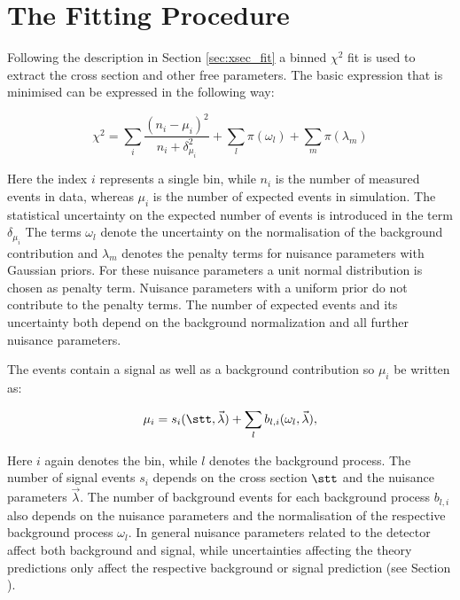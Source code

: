 	
\section{The Fitting Procedure}
\label{sec:xsec_stat}

Following the description in Section \ref{sec:xsec_fit} a binned $\chi^2$ fit is used to extract the cross section and other free parameters.
The basic expression that is minimised can be expressed in the following way:

\begin{equation}
  \chi^2  = \sum_{i} \frac{(n_i-\mu_i)^2}{n_i + \delta_{\mu_i}^2} + \sum_{l} \pi(\omega_l) + \sum_{m} \pi(\lambda_m)
\label{eq:xsec_chisqfunct}
\end{equation}

Here the index $i$ represents a single bin, while $n_i$ is the number of measured events in data, whereas $\mu_i$ is the number
of expected events in simulation. The statistical uncertainty on the expected number of events is introduced in the term $\delta_{\mu_i}$ The terms $\omega_l$ denote the uncertainty on the normalisation of the background contribution and $\lambda_m$
denotes the penalty terms for nuisance parameters with Gaussian priors. For these nuisance parameters a unit normal distribution is chosen as penalty term. Nuisance parameters with a uniform prior do not contribute to the penalty terms.
The number of expected events and its uncertainty both depend on the background normalization and all further nuisance parameters.

The events contain a signal as well as a background contribution so $\mu_i$ be written as:

\begin{equation}
\mu_i = s_i(\stt,\vec{\lambda}) 
+ \sum_{l} b_{l,i}(\omega_l,\vec{\lambda}),
\label{eq:xsec_expectev}
\end{equation} 

Here $i$ again denotes the bin, while $l$ denotes the background process. The number of signal events $s_i$ depends on the \ttbar cross section $\stt$ and the nuisance parameters $\vec{\lambda}$.
The number of background events for each background process $b_{l,i}$ also depends on the nuisance parameters and the normalisation of the respective background process $\omega_l$.
In general nuisance parameters related to the detector affect both background and signal, while uncertainties affecting the theory predictions only affect the respective background or signal prediction (see Section ).


